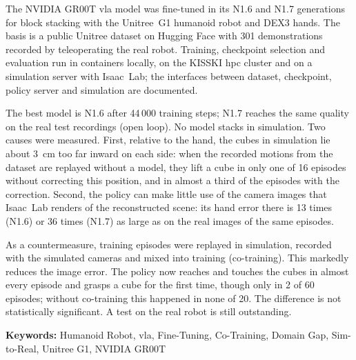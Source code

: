 The NVIDIA GR00T \ac{vla} model was fine-tuned in its N1.6 and N1.7 generations for block
stacking with the Unitree~G1 humanoid robot and DEX3 hands. The basis is a public Unitree
dataset on Hugging Face with 301 demonstrations recorded by teleoperating the real robot.
Training, checkpoint selection and evaluation run in containers locally, on the KISSKI \ac{hpc}
cluster and on a simulation server with Isaac~Lab; the interfaces between dataset, checkpoint,
policy server and simulation are documented.

The best model is N1.6 after 44\,000 training steps; N1.7 reaches the same quality on the real
test recordings (open loop). No model stacks in simulation. Two causes were measured. First,
relative to the hand, the cubes in simulation lie about 3~cm too far inward on each side: when
the recorded motions from the dataset are replayed without a model, they lift a cube in only one
of 16 episodes without correcting this position, and in almost a third of the episodes with the
correction. Second, the policy can
make little use of the camera images that Isaac~Lab renders of the reconstructed scene: its hand
error there is 13 times (N1.6) or 36 times (N1.7) as large as on the real images of the same
episodes.

As a countermeasure, training episodes were replayed in simulation, recorded with the simulated
cameras and mixed into training (co-training). This markedly reduces the image error. The policy
now reaches and touches the cubes in almost every episode and grasps a cube for the first time,
though only in 2 of 60 episodes; without co-training this happened in none of 20. The difference
is not statistically significant. A test on the real robot is still outstanding.

\bigskip
\noindent\textbf{Keywords:}
Humanoid Robot, \ac{vla}, Fine-Tuning, Co-Training, Domain Gap, Sim-to-Real, Unitree G1,
NVIDIA GR00T

\cleardoublepage

